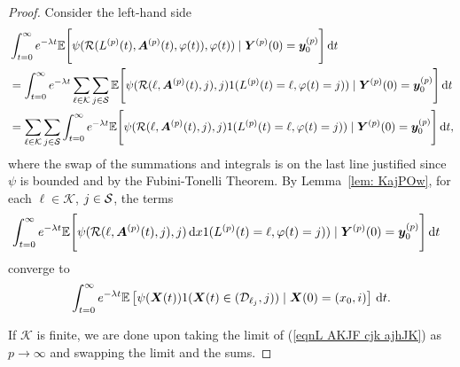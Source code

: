 \begin{proof}
	Consider the left-hand side 
	\begin{align}
		&\int_{t=0}^\infty e^{-\lambda t}\mathbb E\Bigg[\psi( \mathcal R(L^{(p)}(t),\boldsymbol A^{(p)}(t),\varphi(t)),\varphi(t) )   \mid 
		  \boldsymbol Y^{(p)}(0)=\boldsymbol y_0^{(p)} \Bigg] \, \mathrm{d} t \nonumber 
		\\&= \int_{t=0}^\infty e^{-\lambda t}\sum_{\ell\in\mathcal K}\sum_{j\in\mathcal S}\mathbb E\Bigg[\psi( \mathcal R(\ell,\boldsymbol A^{(p)}(t),j),j )  1({L}^{(p)}(t)=\ell,\varphi(t)=j))  \mid \nonumber
		 \boldsymbol Y^{(p)}(0)=\boldsymbol y_0^{(p)} \Bigg] \, \mathrm{d} t \nonumber 
		\\&= \sum_{\ell\in\mathcal K}\sum_{j\in\mathcal S}\int_{t=0}^\infty e^{-\lambda t}\mathbb E\Bigg[ \psi( \mathcal R(\ell,\boldsymbol A^{(p)}(t),j),j )1({L}^{(p)}(t)=\ell,\varphi(t)=j))  \mid 
		 \boldsymbol Y^{(p)}(0)=\boldsymbol y_0^{(p)} \Bigg] \, \mathrm{d} t, \label{eqnL AKJF cjk ajhJK}
	\end{align}
	where the swap of the summations and integrals is on the last line justified since \(\psi\) is bounded and by the Fubini-Tonelli Theorem. By Lemma~\ref{lem: KajPOw}, for each \(\ell\in\mathcal K\), \(j\in\mathcal{S}\), the terms 
	 \begin{align}
	 	&\int_{t=0}^\infty e^{-\lambda t}\mathbb E\Bigg[\psi( \mathcal R(\ell,\boldsymbol A^{(p)}(t),j), j )\, \mathrm{d} x 1({L}^{(p)}(t)=\ell,\varphi(t)=j))  \mid \nonumber
		 \boldsymbol Y^{(p)}(0)=\boldsymbol y_0^{(p)} \Bigg] \, \mathrm{d} t
	\end{align}
		converge to 
	\[\int_{t=0}^\infty e^{-\lambda t}  \mathbb E\left[\psi({\boldsymbol X}(t) )1(\boldsymbol X(t)\in(\mathcal D_{\ell_j},j))\mid \boldsymbol X(0)=(x_0,i) \right] \, \mathrm{d} t.\]
	
	If \(\mathcal K\) is finite, we are done upon taking the limit of (\ref{eqnL AKJF cjk ajhJK}) as \(p\to\infty\) and swapping the limit and the sums. 
	

\end{proof}
